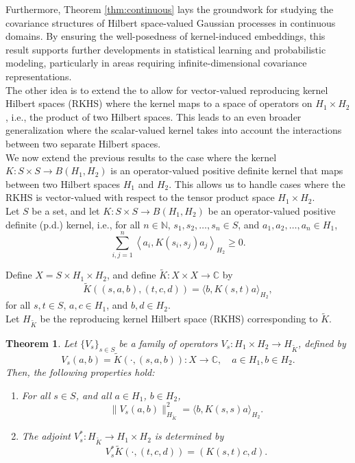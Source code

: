 \documentclass[11pt]{amsart}
\newtheorem{theorem}{Theorem}[section]
\theoremstyle{definition}
\numberwithin{equation}{section}
\begin{document}
Furthermore, Theorem \ref{thm:continuous} lays the groundwork for studying the covariance structures of Hilbert space-valued Gaussian processes in continuous domains. By ensuring the well-posedness of kernel-induced embeddings, this result supports further developments in statistical learning and probabilistic modeling, particularly in areas requiring infinite-dimensional covariance representations.\\

\noindent
The other idea is to extend the \cite[Theorem 2.1]{Jorgensen2024} to allow for vector-valued reproducing kernel Hilbert spaces (RKHS) where the kernel maps to a space of operators on $H_1 \times H_2$, i.e., the product of two Hilbert spaces. This leads to an even broader generalization where the scalar-valued kernel takes into account the interactions between two separate Hilbert spaces.\\

\noindent
We now extend the previous results to the case where the kernel \( K: S \times S \to B(H_1, H_2) \) is an operator-valued positive definite kernel that maps between two Hilbert spaces \( H_1 \) and \( H_2 \). This allows us to handle cases where the RKHS is vector-valued with respect to the tensor product space \( H_1 \times H_2 \).\\

\noindent
Let \( S \) be a set, and let \( K: S \times S \to B(H_1, H_2) \) be an operator-valued positive definite (p.d.) kernel, i.e., for all \( n \in \mathbb{N} \), \( s_1, s_2, \dots, s_n \in S \), and \( a_1, a_2, \dots, a_n \in H_1 \),
\[
\sum_{i,j=1}^{n} \left\langle a_i, K(s_i, s_j) a_j \right\rangle_{H_2} \geq 0.
\]

Define \( X = S \times H_1 \times H_2 \), and define \( \tilde{K}: X \times X \to \mathbb{C} \) by
\[
\tilde{K}((s, a, b), (t, c, d)) = \langle b, K(s, t) a \rangle_{H_2},
\]
for all \( s, t \in S \), \( a, c \in H_1 \), and \( b, d \in H_2 \).\\

\noindent
Let \( H_{\tilde{K}} \) be the reproducing kernel Hilbert space (RKHS) corresponding to \( \tilde{K} \).

\begin{theorem}
\label{thm:product_kernel}
Let \( \{ V_s \}_{s \in S} \) be a family of operators \( V_s: H_1 \times H_2 \to H_{\tilde{K}} \), defined by
\[
V_s (a, b) = \tilde{K}(\cdot, (s, a, b)): X \to \mathbb{C}, \quad a \in H_1, b \in H_2.
\]
Then, the following properties hold:
\begin{enumerate}
    \item For all \( s \in S \), and all \( a \in H_1 \), \( b \in H_2 \),
    \[
    \|V_s (a, b)\|_{H_{\tilde{K}}}^2 = \langle b, K(s, s) a \rangle_{H_2}.
    \]
    
    \item The adjoint \( V_s^*: H_{\tilde{K}} \to H_1 \times H_2 \) is determined by
    \[
    V_s^* \tilde{K}(\cdot, (t, c, d)) = (K(s, t) c, d).
    \]
\end{enumerate}
\end{theorem}
\end{document}
